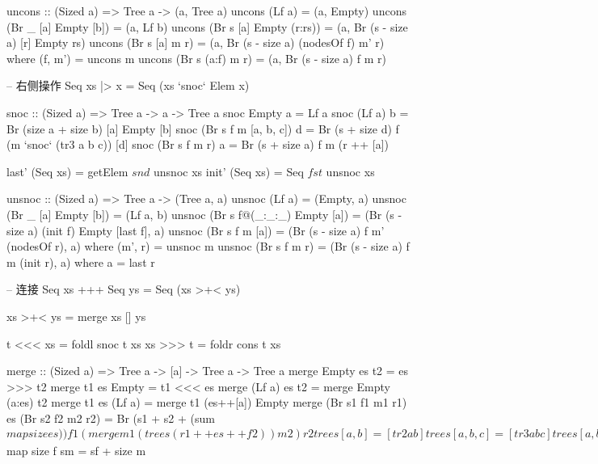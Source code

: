 \documentclass[b5paper]{ctexart}
\begin{document}
\begin{Haskell}
uncons :: (Sized a) => Tree a -> (a, Tree a)
uncons (Lf a) = (a, Empty)
uncons (Br _ [a] Empty [b]) = (a, Lf b)
uncons (Br s [a] Empty (r:rs)) = (a, Br (s - size a) [r] Empty rs)
uncons (Br s [a] m r) = (a, Br (s - size a) (nodesOf f) m' r)
    where (f, m') = uncons m
uncons (Br s (a:f) m r) = (a, Br (s - size a) f m r)

-- 右侧操作
Seq xs |> x  = Seq (xs `snoc` Elem x)

snoc :: (Sized a) => Tree a -> a -> Tree a
snoc Empty a = Lf a
snoc (Lf a) b = Br (size a + size b) [a] Empty [b]
snoc (Br s f m [a, b, c]) d = Br (s + size d) f (m `snoc` (tr3 a b c)) [d]
snoc (Br s f m r) a = Br (s + size a) f m (r ++ [a])

last' (Seq xs) = getElem $ snd $ unsnoc xs
init' (Seq xs) = Seq $ fst $ unsnoc xs

unsnoc :: (Sized a) => Tree a -> (Tree a, a)
unsnoc (Lf a) = (Empty, a)
unsnoc (Br _ [a] Empty [b]) = (Lf a, b)
unsnoc (Br s f@(_:_:_) Empty [a]) = (Br (s - size a) (init f) Empty [last f], a)
unsnoc (Br s f m [a]) = (Br (s - size a) f m' (nodesOf r), a)
    where (m', r) = unsnoc m
unsnoc (Br s f m r) = (Br (s - size a) f m (init r), a) where a = last r

-- 连接
Seq xs +++ Seq ys = Seq (xs >+< ys)

xs >+< ys = merge xs [] ys

t <<< xs = foldl snoc t xs
xs >>> t = foldr cons t xs

merge :: (Sized a) => Tree a -> [a] -> Tree a -> Tree a
merge Empty es t2 = es >>> t2
merge t1 es Empty = t1 <<< es
merge (Lf a) es t2 = merge Empty (a:es) t2
merge t1 es (Lf a) = merge t1 (es++[a]) Empty
merge (Br s1 f1 m1 r1) es (Br s2 f2 m2 r2) =
    Br (s1 + s2 + (sum $ map size es)) f1 (merge m1 (trees (r1 ++ es ++ f2)) m2) r2

trees [a, b] = [tr2 a b]
trees [a, b, c] = [tr3 a b c]
trees [a, b, c, d] = [tr2 a b, tr2 c d]
trees (a:b:c:es) = (tr3 a b c):trees es

-- 索引
data Place a = Place Int a

getAt :: Seq a -> Int -> Maybe a
getAt (Seq xs) i | i < size xs = case lookupTree i xs of
                     Place _ (Elem x) -> Just x
                 | otherwise = Nothing

lookupTree :: (Sized a) => Int -> Tree a -> Place a
lookupTree n (Lf a) = Place n a
lookupTree n (Br s f m r) | n < sf = lookups n f
                          | n < sm = case lookupTree (n - sf) m of
                                            Place n' xs -> lookupNode n' xs
                          | n < s = lookups (n - sm) r
  where sf = sum $ map size f
        sm = sf + size m


\end{Haskell}
\end{document}
